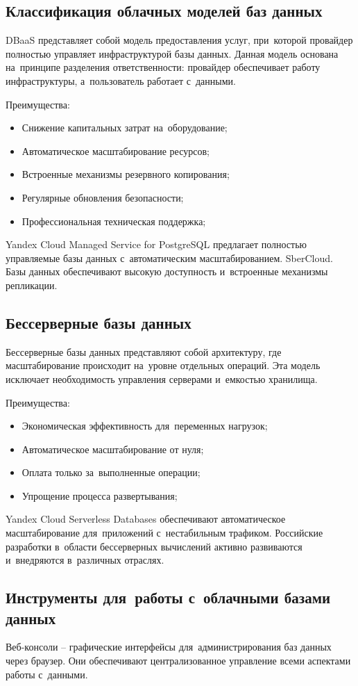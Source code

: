 \documentclass{ou}
\begin{document}
\subsection{Классификация облачных моделей баз данных}
DBaaS представляет собой модель предоставления услуг, при~которой провайдер полностью управляет инфраструктурой базы данных. Данная модель основана на~принципе разделения ответственности: провайдер обеспечивает работу инфраструктуры, а~пользователь работает с~данными.

Преимущества:
\begin{itemize}[label=-, itemindent=4em, nosep]
\item Снижение капитальных затрат на~оборудование;
\item Автоматическое масштабирование ресурсов;
\item Встроенные механизмы резервного копирования;
\item Регулярные обновления безопасности;
\item Профессиональная техническая поддержка;
\end{itemize}

Yandex Cloud Managed Service for PostgreSQL предлагает полностью управляемые базы данных с~автоматическим масштабированием. SberCloud. Базы данных обеспечивают высокую доступность и~встроенные механизмы репликации.
\subsection{Бессерверные базы данных}
Бессерверные базы данных представляют собой архитектуру, где масштабирование происходит на~уровне отдельных операций. Эта модель исключает необходимость управления серверами и~емкостью хранилища.

Преимущества:
\begin{itemize}[label=-, itemindent=4em, nosep]
\item Экономическая эффективность для~переменных нагрузок;
\item Автоматическое масштабирование от нуля;
\item Оплата только за~выполненные операции;
\item Упрощение процесса развертывания;
\end{itemize}

Yandex Cloud Serverless Databases обеспечивают автоматическое масштабирование для~приложений с~нестабильным трафиком. Российские разработки в~области бессерверных вычислений активно развиваются и~внедряются в~различных отраслях.
\subsection{Инструменты для~работы с~облачными базами данных}
Веб-консоли -- графические интерфейсы для~администрирования баз данных через браузер. Они обеспечивают централизованное управление всеми аспектами работы с~данными.
\end{document}
